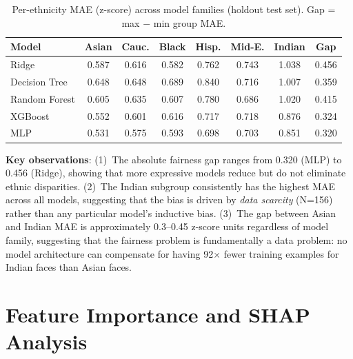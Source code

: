 \documentclass[a4paper,oneside,bibliography=totoc]{scrbook}
\begin{document}
\begin{table}[h]
\centering
\caption{Per-ethnicity MAE (z-score) across model families (holdout test set). Gap = max $-$ min group MAE.}
\label{tab:fairness_multi}
\small
\begin{tabular}{lccccccc}
\toprule
\textbf{Model} & \textbf{Asian} & \textbf{Cauc.} & \textbf{Black} & \textbf{Hisp.} & \textbf{Mid-E.} & \textbf{Indian} & \textbf{Gap} \\
\midrule
Ridge & 0.587 & 0.616 & 0.582 & 0.762 & 0.743 & 1.038 & 0.456 \\
Decision Tree & 0.648 & 0.648 & 0.689 & 0.840 & 0.716 & 1.007 & 0.359 \\
Random Forest & 0.605 & 0.635 & 0.607 & 0.780 & 0.686 & 1.020 & 0.415 \\
XGBoost & 0.552 & 0.601 & 0.616 & 0.717 & 0.718 & 0.876 & 0.324 \\
MLP & 0.531 & 0.575 & 0.593 & 0.698 & 0.703 & 0.851 & 0.320 \\
\bottomrule
\end{tabular}
\end{table}

\textbf{Key observations}: (1)~The absolute fairness gap ranges from 0.320 (MLP) to 0.456 (Ridge), showing that more expressive models reduce but do not eliminate ethnic disparities. (2)~The Indian subgroup consistently has the highest MAE across all models, suggesting that the bias is driven by \emph{data scarcity} (N=156) rather than any particular model's inductive bias. (3)~The gap between Asian and Indian MAE is approximately 0.3--0.45 z-score units regardless of model family, suggesting that the fairness problem is fundamentally a data problem: no model architecture can compensate for having 92$\times$ fewer training examples for Indian faces than Asian faces.

\section{Feature Importance and SHAP Analysis}
\vspace{-1.5em}
\end{document}
